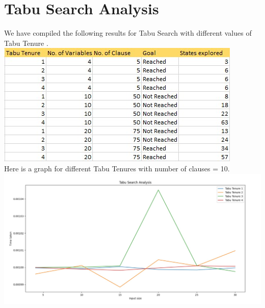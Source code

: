 \documentclass{article}
\begin{document}
\section{Tabu Search Analysis}
We have compiled the following results for Tabu Search with different values of Tabu Tenure .
\vspace*{10pt}
\\\hspace*{50pt}\includegraphics{Table2.jpg}
\vspace*{10pt}
\\Here is a graph for different Tabu Tenures with number of clauses = 10. 
\\\includegraphics[scale=0.35]{TabuSearch.jpg}
\newpage
\end{document}
